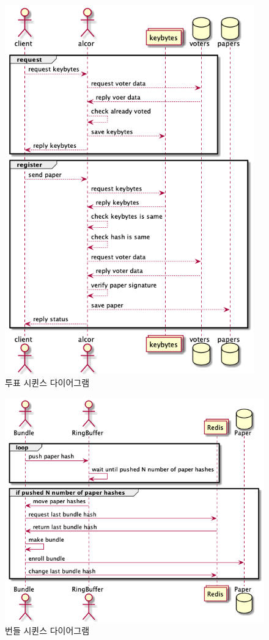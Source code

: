 \documentclass[10pt,a4paper,left=15mm,right=15mm,top=20mm,bottom=20mm]{article}
\begin{document}
    \begin{figure}[h]
        \begin{center}
            \includegraphics[height=16cm]{vote}
            \caption{투표 시퀸스 다이어그램}
        \end{center}
    \end{figure}

    \begin{figure}[h]
        \begin{center}
            \includegraphics[width=15cm]{bundle-seq}
            \caption{번들 시퀸스 다이어그램}
        \end{center}
    \end{figure}
\end{document}
